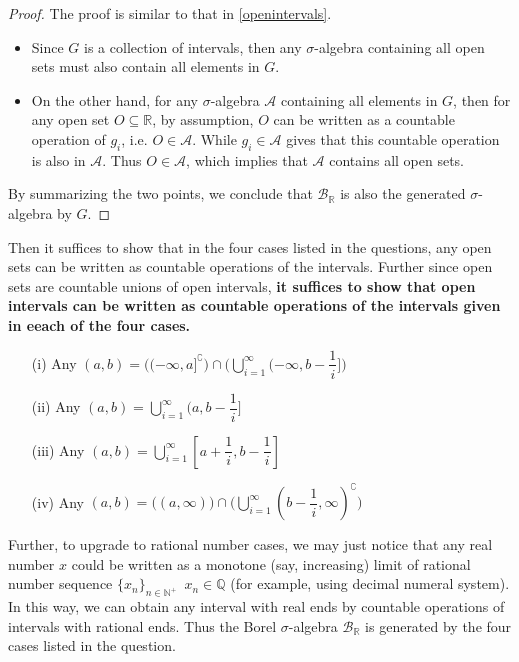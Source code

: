 \documentclass[11pt,a4paper]{article}
\numberwithin{equation}{section}%
\begin{document}
\begin{proof}
    The proof is similar to that in \ref{openintervals}.
    \begin{itemize}[topsep=2pt,itemsep=0pt]
        \item Since $ G $ is a collection of intervals, then any $ \sigma  $-algebra containing all open sets must also contain all elements in $ G $.
        \item On the other hand, for any $ \sigma  $-algebra $ \mathcal{A} $ containing all elements in $ G $, then for any open set $ O\subseteq \mathbb{R} $, by assumption, $ O $ can be written as a countable operation of $ g_i $, i.e. $ O\in \mathcal{A} $. While $ g_i\in  \mathcal{A} $ gives that this countable operation is also in $ \mathcal{A} $. Thus $ O\in \mathcal{A} $, which implies that $ \mathcal{A} $ contains all open sets.
    \end{itemize}
    By summarizing the two points, we conclude that $ \mathcal{B}_\mathbb{R} $ is also the generated $ \sigma $-algebra by $ G $.
\end{proof}


Then it suffices to show that in the four cases listed in the questions, any open sets can be written as countable operations of the intervals. Further since open sets are countable unions of open intervals, \textbf{it suffices to show that open intervals can be written as countable operations of the intervals given in eeach of the four cases.}

\begin{itemize}[topsep=2pt,itemsep=0pt]
    \item[(i)] Any $ (a,b) = \big( (-\infty ,a]^\complement \big) \cap \big( \bigcup_{i=1}^\infty (-\infty, b-\dfrac{ 1 }{ i } ] \big) $
    \item[(ii)] Any $ (a,b) =  \bigcup_{i=1}^\infty (a, b-\dfrac{ 1 }{ i } ] $
    \item[(iii)] Any $ (a,b) =  \bigcup_{i=1}^\infty [a+\dfrac{ 1 }{ i }, b - \dfrac{ 1 }{ i } ]$
    \item[(iv)] Any $ (a,b) =  \big((a,\infty)\big)\cap \big( \bigcup_{i=1}^\infty (b-\dfrac{ 1 }{ i },\infty )^\complement \big)$
\end{itemize}

Further, to upgrade to rational number cases, we may just notice that any real number $ x $ could be written as a monotone (say, increasing) limit of rational number sequence $ \{x_n\}_{n\in \mathbb{N}^+} $\, $ x_n\in \mathbb{Q} $ (for example, using decimal numeral system). In this way, we can obtain any interval with real ends by countable operations of intervals with rational ends. Thus the Borel $ \sigma $-algebra $ \mathcal{B}_\mathbb{R} $ is generated by the four cases listed in the question.
\end{document}
